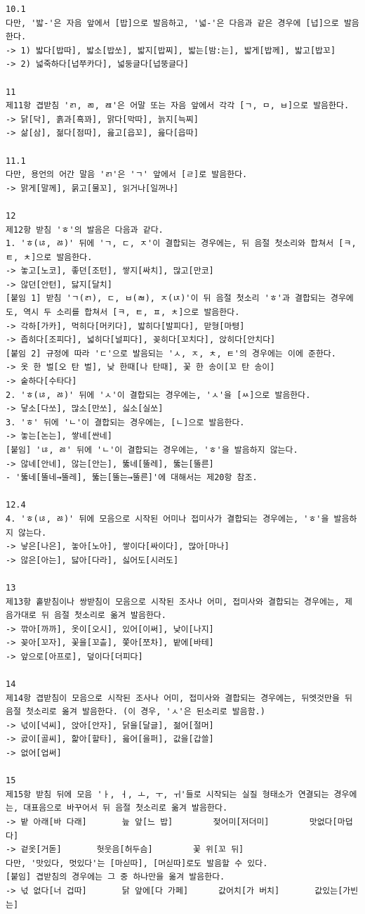 \documentclass[letterpaper]{article} %
\begin{document}
\begin{verbatim}
10.1
다만, '밟-'은 자음 앞에서 [밥]으로 발음하고, '넓-'은 다음과 같은 경우에 [넙]으로 발음한다.
-> 1) 밟다[밥따], 밟소[밥쏘], 밟지[밥찌], 밟는[밤:는], 밟게[밥께], 밟고[밥꼬]
-> 2) 넓죽하다[넙쭈카다], 넓둥글다[넙뚱글다]

11
제11항 겹받침 'ㄺ, ㄻ, ㄿ'은 어말 또는 자음 앞에서 각각 [ㄱ, ㅁ, ㅂ]으로 발음한다.
-> 닭[닥], 흙과[흑꽈], 맑다[막따], 늙지[늑찌]
-> 삶[삼], 젊다[점따], 읊고[읍꼬], 읊다[읍따]

11.1
다만, 용언의 어간 말음 'ㄺ'은 'ㄱ' 앞에서 [ㄹ]로 발음한다.
-> 맑게[말께], 묽고[물꼬], 읽거나[일꺼나]

12
제12항 받침 'ㅎ'의 발음은 다음과 같다.
1. 'ㅎ(ㄶ, ㅀ)' 뒤에 'ㄱ, ㄷ, ㅈ'이 결합되는 경우에는, 뒤 음절 첫소리와 합쳐서 [ㅋ, ㅌ, ㅊ]으로 발음한다.
-> 놓고[노코], 좋던[조턴], 쌓지[싸치], 많고[만코]
-> 않던[안턴], 닳지[달치]
[붙임 1] 받침 'ㄱ(ㄺ), ㄷ, ㅂ(ㄼ), ㅈ(ㄵ)'이 뒤 음절 첫소리 'ㅎ'과 결합되는 경우에도, 역시 두 소리를 합쳐서 [ㅋ, ㅌ, ㅍ, ㅊ]으로 발음한다.
-> 각하[가카], 먹히다[머키다], 밟히다[발피다], 맏형[마텽]
-> 좁히다[조피다], 넓히다[널피다], 꽂히다[꼬치다], 앉히다[안치다]
[붙임 2] 규정에 따라 'ㄷ'으로 발음되는 'ㅅ, ㅈ, ㅊ, ㅌ'의 경우에는 이에 준한다.
-> 옷 한 벌[오 탄 벌], 낮 한때[나 탄때], 꽃 한 송이[꼬 탄 송이]
-> 숱하다[수타다]
2. 'ㅎ(ㄶ, ㅀ)' 뒤에 'ㅅ'이 결합되는 경우에는, 'ㅅ'을 [ㅆ]으로 발음한다.
-> 닿소[다쏘], 많소[만쏘], 싫소[실쏘]
3. 'ㅎ' 뒤에 'ㄴ'이 결합되는 경우에는, [ㄴ]으로 발음한다.
-> 놓는[논는], 쌓네[싼네]
[붙임] 'ㄶ, ㅀ' 뒤에 'ㄴ'이 결합되는 경우에는, 'ㅎ'을 발음하지 않는다.
-> 않네[안네], 않는[안는], 뚫네[뚤레], 뚫는[뚤른]
- '뚫네[뚤네→뚤레], 뚫는[뚤는→뚤른]'에 대해서는 제20항 참조.

12.4
4. 'ㅎ(ㄶ, ㅀ)' 뒤에 모음으로 시작된 어미나 접미사가 결합되는 경우에는, 'ㅎ'을 발음하지 않는다.
-> 낳은[나은], 놓아[노아], 쌓이다[싸이다], 많아[마나]
-> 않은[아는], 닳아[다라], 싫어도[시러도]

13
제13항 홑받침이나 쌍받침이 모음으로 시작된 조사나 어미, 접미사와 결합되는 경우에는, 제 음가대로 뒤 음절 첫소리로 옮겨 발음한다.
-> 깎아[까까], 옷이[오시], 있어[이써], 낮이[나지]
-> 꽂아[꼬자], 꽃을[꼬츨], 쫓아[쪼차], 밭에[바테]
-> 앞으로[아프로], 덮이다[더피다]

14
제14항 겹받침이 모음으로 시작된 조사나 어미, 접미사와 결합되는 경우에는, 뒤엣것만을 뒤 음절 첫소리로 옮겨 발음한다. (이 경우, 'ㅅ'은 된소리로 발음함.)
-> 넋이[넉씨], 앉아[안자], 닭을[달글], 젊어[절머]
-> 곬이[골씨], 핥아[할타], 읊어[을퍼], 값을[갑쓸]
-> 없어[업써]

15
제15항 받침 뒤에 모음 'ㅏ, ㅓ, ㅗ, ㅜ, ㅟ'들로 시작되는 실질 형태소가 연결되는 경우에는, 대표음으로 바꾸어서 뒤 음절 첫소리로 옮겨 발음한다.
-> 밭 아래[바 다래] 		늪 앞[느 밥] 		젖어미[저더미] 		맛없다[마덥다]
-> 겉옷[거돋] 		헛웃음[허두슴] 		꽃 위[꼬 뒤]
다만, '맛있다, 멋있다'는 [마싣따], [머싣따]로도 발음할 수 있다.
[붙임] 겹받침의 경우에는 그 중 하나만을 옮겨 발음한다.
-> 넋 없다[너 겁따] 		닭 앞에[다 가페] 		값어치[가 버치] 		값있는[가빈는]


\end{verbatim}
\end{document}
